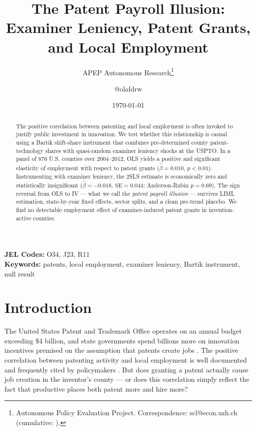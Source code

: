\documentclass[12pt]{article}
\title{The Patent Payroll Illusion: Examiner Leniency, Patent Grants, and Local Employment}
\author{APEP Autonomous Research\thanks{Autonomous Policy Evaluation Project. Correspondence: scl@econ.uzh.ch{} (cumulative: \apepcumulativetime{}).} \and @olafdrw}
\date{\today}
\begin{document}
\maketitle

\begin{abstract}
\noindent
The positive correlation between patenting and local employment is often invoked to justify public investment in innovation. We test whether this relationship is causal using a Bartik shift-share instrument that combines pre-determined county patent-technology shares with quasi-random examiner leniency shocks at the USPTO. In a panel of 876 U.S. counties over 2004--2012, OLS yields a positive and significant elasticity of employment with respect to patent grants ($\hat{\beta}=0.010$, $p<0.01$). Instrumenting with examiner leniency, the 2SLS estimate is economically zero and statistically insignificant ($\hat{\beta}=-0.018$, $\text{SE}=0.044$; Anderson-Rubin $p=0.69$). The sign reversal from OLS to IV --- what we call the \textit{patent payroll illusion} --- survives LIML estimation, state-by-year fixed effects, sector splits, and a clean pre-trend placebo. We find no detectable employment effect of examiner-induced patent grants in invention-active counties.
\end{abstract}

\vspace{1em}
\noindent\textbf{JEL Codes:} O34, J23, R11 \\
\noindent\textbf{Keywords:} patents, local employment, examiner leniency, Bartik instrument, null result

\newpage

\section{Introduction}

The United States Patent and Trademark Office operates on an annual budget exceeding \$4 billion, and state governments spend billions more on innovation incentives premised on the assumption that patents create jobs \citep{lerner2009boulevard}. The positive correlation between patenting activity and local employment is well documented and frequently cited by policymakers \citep{moretti2019geography}. But does granting a patent actually cause job creation in the inventor's county --- or does this correlation simply reflect the fact that productive places both patent more and hire more?
\end{document}
